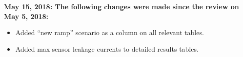 \documentclass[10pt,]{article}
\begin{document}
{ \bf
May 15, 2018: The following changes were made since the review on May 5, 2018:}
\begin{itemize}
  \item Added ``new ramp'' scenario as a column on all relevant tables.
  \item Added max sensor leakage currents to detailed results tables.
\end{itemize}




\clearpage

\clearpage


\clearpage


\clearpage

\clearpage

\clearpage

\begin{appendices}

\end{appendices}
\restoregeometry
\end{document}
